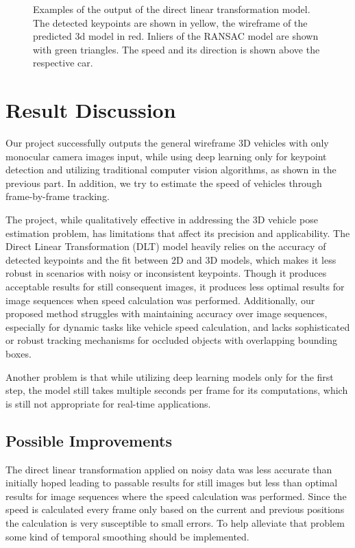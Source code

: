 \documentclass[conference]{IEEEtran}
\begin{document}
\begin{figure}[htbp]
    \caption{Examples of the output of the direct linear transformation model. The detected keypoints are shown in yellow, the wireframe of the predicted 3d model in red. Inliers of the RANSAC model are shown with green triangles. The speed and its direction is shown above the respective car.}
    \label{img:exampleOutput}
\end{figure}

\section{Result Discussion}

Our project successfully outputs the general wireframe 3D vehicles with only monocular camera images input, while using deep learning only for keypoint detection and utilizing traditional computer vision algorithms, as shown in the previous part. In addition, we try to estimate the speed of vehicles through frame-by-frame tracking.

The project, while qualitatively effective in addressing the 3D vehicle pose estimation problem, has limitations that affect its precision and applicability. The Direct Linear Transformation (DLT) model heavily relies on the accuracy of detected keypoints and the fit between 2D and 3D models, which makes it less robust in scenarios with noisy or inconsistent keypoints. Though it produces acceptable results for still consequent images, it produces less optimal results for image sequences when speed calculation was performed. Additionally, our proposed method struggles with maintaining accuracy over image sequences, especially for dynamic tasks like vehicle speed calculation, and lacks sophisticated or robust tracking mechanisms for occluded objects with overlapping bounding boxes. 

Another problem is that while utilizing deep learning models only for the first step, the model still takes multiple seconds per frame for its computations, which is still not appropriate for real-time applications.

\subsection{Possible Improvements}

The direct linear transformation applied on noisy data was less accurate than initially hoped leading to passable results for still images but less than optimal results for image sequences where the speed calculation was performed. Since the speed is calculated every frame only based on the current and previous positions the calculation is very susceptible to small errors. To help alleviate that problem some kind of temporal smoothing should be implemented. 
\end{document}
